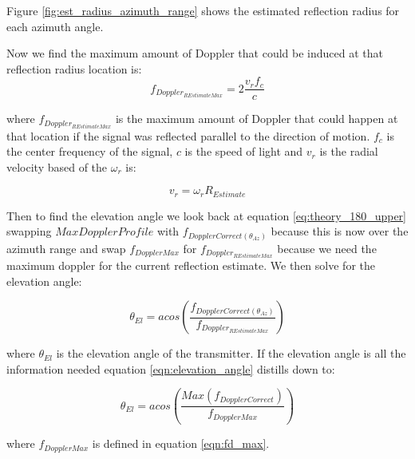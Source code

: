 Figure \ref{fig:est_radius_azimuth_range} shows the estimated reflection radius for each azimuth angle.

Now we find the maximum amount of Doppler that could be induced at that reflection radius location is:
\begin{equation}
	f_{Doppler_{R Estimate Max}} = 2\frac{v_r f_c}{c}
	\label{eqn:max_doppler}
\end{equation}

where $f_{Doppler_{R Estimate Max}}$ is the maximum amount of Doppler that could happen at that location if the signal was reflected parallel to the direction of motion. $f_c$ is the center frequency of the signal, $c$ is the speed of light and $v_r$ is the radial velocity based of the $\omega_r$ is:

\begin{equation}
	v_r = \omega_r R_{Estimate}
	\label{eqn:v_radial}
\end{equation}

Then to find the elevation angle we look back at equation \ref{eq:theory_180_upper} swapping $MaxDopplerProfile$ with $f_{DopplerCorrect(\theta_{Az})}$ because this is now over the azimuth range and swap $f_{DopplerMax}$ for $f_{Doppler_{R Estimate Max}}$ because we need the maximum doppler for the current reflection estimate. We then solve for the elevation angle:

\begin{equation}
	\theta_{El} = acos\left(\frac{f_{DopplerCorrect(\theta_{Az})}}{f_{Doppler_{R Estimate Max}}}\right)
	\label{eqn:elevation_angle}
\end{equation}

where $\theta_{El}$ is the elevation angle of the transmitter. If the elevation angle is all the information needed equation \ref{eqn:elevation_angle} distills down to:

\begin{equation}
	\theta_{El} = acos\left(\frac{Max(f_{DopplerCorrect})}{f_{DopplerMax}}\right)
	\label{eqn:elevation_angle_only}
\end{equation}

where $f_{DopplerMax}$ is defined in equation \ref{eqn:fd_max}.

